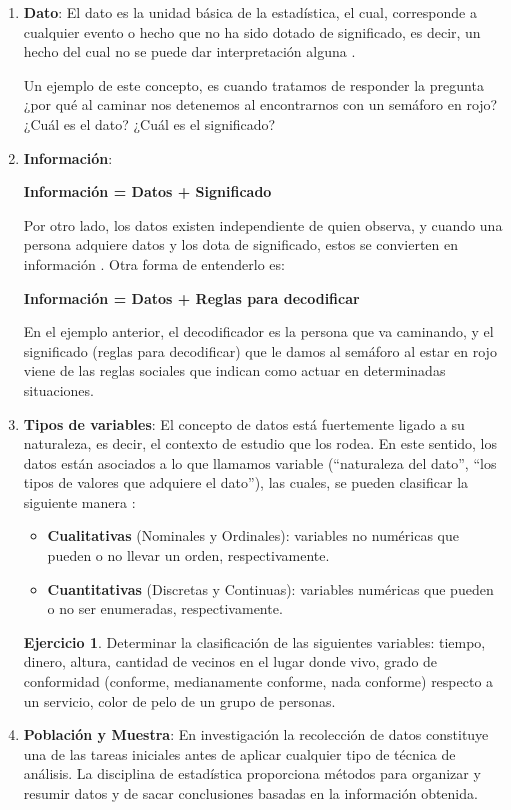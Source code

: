 \documentclass[
  11pt,
]{book}
\providecommand{\tightlist}{%
  \setlength{\itemsep}{0pt}\setlength{\parskip}{0pt}}
\theoremstyle{definition}
\theoremstyle{definition}
\theoremstyle{definition}
\newtheorem{exercise}{Ejercicio}[chapter]
\theoremstyle{definition}
\theoremstyle{remark}
\begin{document}
\begin{enumerate}
\def\labelenumi{\arabic{enumi}.}
\item
  \textbf{Dato}: El dato es la unidad básica de la estadística, el cual, corresponde a cualquier evento o hecho que no ha sido dotado de significado, es decir, un hecho del cual no se puede dar interpretación alguna \citep{brachman_knowledge_2004}.

  Un ejemplo de este concepto, es cuando tratamos de responder la pregunta ¿por qué al caminar nos detenemos al encontrarnos con un semáforo en rojo? ¿Cuál es el dato? ¿Cuál es el significado?
\item
  \textbf{Información}:

  \textbf{Información = Datos + Significado}

  Por otro lado, los datos existen independiente de quien observa, y cuando una persona adquiere datos y los dota de significado, estos se convierten en información \citep{brachman_knowledge_2004}. Otra forma de entenderlo es:

  \textbf{Información = Datos + Reglas para decodificar}

  En el ejemplo anterior, el decodificador es la persona que va caminando, y el significado (reglas para decodificar) que le damos al semáforo al estar en rojo viene de las reglas sociales que indican como actuar en determinadas situaciones.
\item
  \textbf{Tipos de variables}:
  El concepto de datos está fuertemente ligado a su naturaleza, es decir, el contexto de estudio que los rodea. En este sentido, los datos están asociados a lo que llamamos variable (``naturaleza del dato'', ``los tipos de valores que adquiere el dato''), las cuales, se pueden clasificar la siguiente manera \citep[página 7]{anderson}:

  \begin{itemize}
  \tightlist
  \item
    \textbf{Cualitativas} (Nominales y Ordinales): variables no numéricas que pueden o no llevar un orden, respectivamente.
  \item
    \textbf{Cuantitativas} (Discretas y Continuas): variables numéricas que pueden o no ser enumeradas, respectivamente.
  \end{itemize}

  \begin{exercise}
  Determinar la clasificación de las siguientes variables: tiempo, dinero, altura, cantidad de vecinos en el lugar donde vivo, grado de conformidad (conforme, medianamente conforme, nada conforme) respecto a un servicio, color de pelo de un grupo de personas.
  \end{exercise}
\item
  \textbf{Población y Muestra}:
  En investigación la recolección de datos constituye una de las tareas iniciales antes de aplicar cualquier tipo de técnica de análisis. La disciplina de estadística proporciona métodos para organizar y resumir datos y de sacar conclusiones basadas en la información obtenida.


\end{enumerate}
\end{document}
